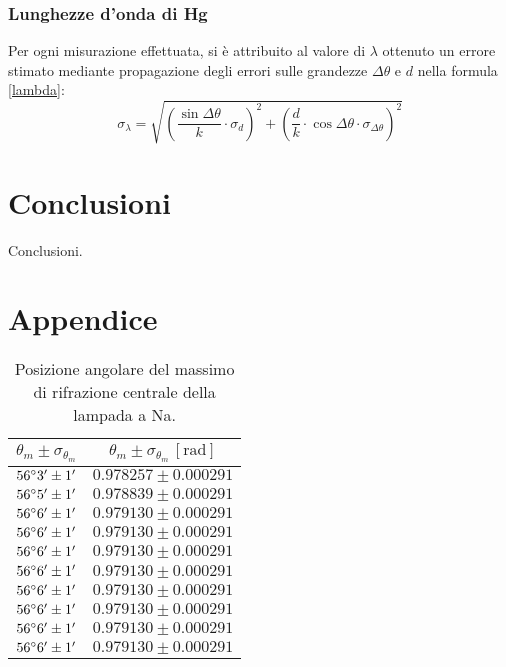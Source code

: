 \documentclass[]{article}
\let\oldsection\section%
\renewcommand{\section}{%
	\renewcommand{\theequation}{\thesection.\arabic{equation}}%
	\oldsection}%
\begin{document}
    \subsubsection{Lunghezze d'onda di Hg}
    Per ogni misurazione effettuata, si è attribuito al valore di $\lambda$ ottenuto un errore stimato mediante propagazione degli errori sulle grandezze $\Delta \theta$ e $d$ nella formula \ref{lambda}:
    \begin{equation}
        \label{lambda-error}
        \sigma_{\lambda} = \sqrt{\left( \frac{\sin{\Delta\theta}}{k}  \cdot \sigma_d \right)^2 + \left(\frac{d}{k} \cdot \cos{\Delta\theta} \cdot \sigma_{\Delta\theta}\right)^2  } 
    \end{equation}
    \label{par:errore_lambda}

    \section{Conclusioni}
    Conclusioni.

    \newpage

    \section*{Appendice}

    \begin{table}
        \centering
        \begin{tabular}{||c|c||}
            \hline
            $\theta_m \pm \sigma_{\theta_m}$ & $\theta_m \pm \sigma_{\theta_m} \, \left[\text{rad}\right]$ \\\hline
            \hline
            $56\degree 3' \pm 1'$ & $0.978257 \pm 0.000291$ \\\hline
            $56\degree 5' \pm 1'$ & $0.978839 \pm 0.000291$ \\\hline
            $56\degree 6' \pm 1'$ & $0.979130 \pm 0.000291$ \\\hline
            $56\degree 6' \pm 1'$ & $0.979130 \pm 0.000291$ \\\hline
            $56\degree 6' \pm 1'$ & $0.979130 \pm 0.000291$ \\\hline
            $56\degree 6' \pm 1'$ & $0.979130 \pm 0.000291$ \\\hline
            $56\degree 6' \pm 1'$ & $0.979130 \pm 0.000291$ \\\hline
            $56\degree 6' \pm 1'$ & $0.979130 \pm 0.000291$ \\\hline
            $56\degree 6' \pm 1'$ & $0.979130 \pm 0.000291$ \\\hline
            $56\degree 6' \pm 1'$ & $0.979130 \pm 0.000291$ \\\hline
        \end{tabular}
        \label{prel-max-c}
        \caption{Posizione angolare del massimo di rifrazione centrale della lampada a Na.}
    \end{table}
\end{document}
